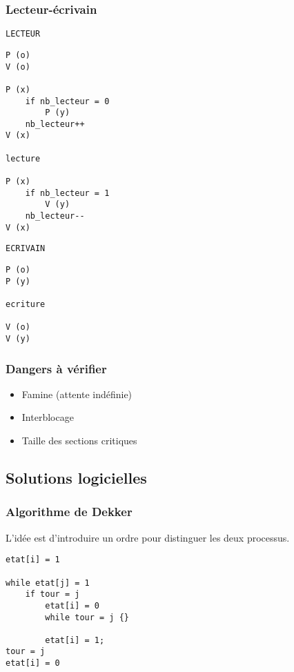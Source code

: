 \documentclass[a4paper]{article}
\begin{document}
\begin{multicols*}{2}
    \subsubsection{Lecteur-\'ecrivain}

    \texttt{LECTEUR}
    \begin{lstlisting}[frame=shadowbox]
P (o)
V (o)

P (x)
    if nb_lecteur = 0
        P (y)
    nb_lecteur++
V (x)

lecture

P (x)
    if nb_lecteur = 1
        V (y)
    nb_lecteur--
V (x)
    \end{lstlisting}


    \texttt{ECRIVAIN}
    \begin{lstlisting}[frame=shadowbox]
P (o)
P (y)

ecriture

V (o)
V (y)
    \end{lstlisting}

    \subsubsection{Dangers à vérifier}

    \begin{itemize}
        \item Famine (attente indéfinie)
        \item Interblocage
        \item Taille des sections critiques
    \end{itemize}

    \subsection{Solutions logicielles}

    \subsubsection{Algorithme de Dekker}

    L'idée est d'introduire un ordre pour distinguer les deux processus.
    \begin{lstlisting}[frame=shadowbox]
etat[i] = 1

while etat[j] = 1
    if tour = j
        etat[i] = 0
        while tour = j {}
        
        etat[i] = 1;
tour = j
etat[i] = 0
    \end{lstlisting}


\end{multicols*}
\end{document}
